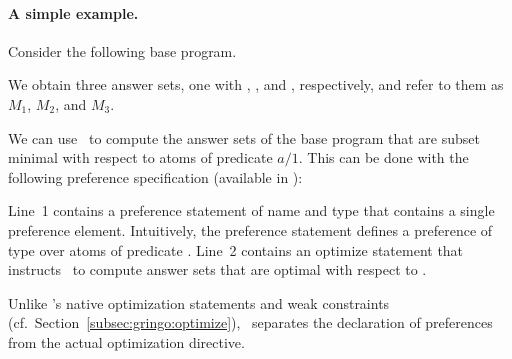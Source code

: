 \paragraph{A simple example.} 
\begin{example}
\label{asprin:example1}
Consider the following base program.
%

%
We obtain three answer sets, one with , , and , respectively,
and refer to them as $M_1$, $M_2$, and $M_3$.

We can use \asprin\ to compute the answer sets of the base program that are subset minimal with respect to atoms of predicate $a/1$. 
This can be done with the following preference specification 
(available in ): 
%

%
Line~1 contains a preference statement of name  and type  that contains a single preference element.
Intuitively, the preference statement  defines a preference of type  over atoms of predicate . 
Line~2 contains an optimize statement that instructs \asprin\ to compute answer sets that are optimal with respect to . 

\begin{note}
Unlike \gringo's native optimization statements and weak constraints (cf.\ Section~\ref{subsec:gringo:optimize}),
\asprin\ separates the declaration of preferences from the actual optimization directive.
\end{note}


\end{example}
